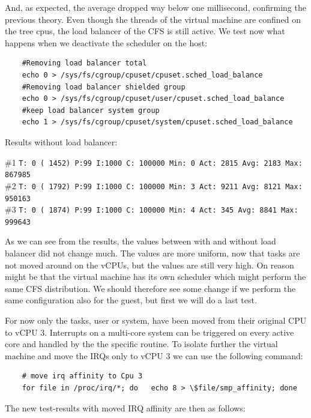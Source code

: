 \documentclass[]{scrartcl}
\begin{document}
And, as expected, the average dropped way below one millisecond, confirming the previous theory.
Even though the threads of the virtual machine are confined on the tree cpus, the load balancer of the CFS is still active. We test now what happens when we deactivate the scheduler on the host:

\begin{verbatim}
	#Removing load balancer total
	echo 0 > /sys/fs/cgroup/cpuset/cpuset.sched_load_balance
	#Removing load balancer shielded group
	echo 0 > /sys/fs/cgroup/cpuset/user/cpuset.sched_load_balance
	#keep load balancer system group
	echo 1 > /sys/fs/cgroup/cpuset/system/cpuset.sched_load_balance
\end{verbatim}

\noindent Results without load balancer:

\noindent \small \#1 \texttt{T: 0 ( 1452) P:99 I:1000 C: 100000 Min: 0 Act: 2815 Avg: 2183 Max:  867985}\\
\noindent \small \#2 \texttt{T: 0 ( 1792) P:99 I:1000 C: 100000 Min: 3 Act: 9211 Avg: 8121 Max:  950163}\\
\noindent \small \#3 \texttt{T: 0 ( 1874) P:99 I:1000 C: 100000 Min: 4 Act:  345 Avg: 8841 Max:  999643}

As we can see from the results, the values between with and without load balancer did not change much. The values are more uniform, now that tasks are not moved around on the vCPUs, but the values are still very high. On reason might be that the virtual machine has its own scheduler which might perform the same CFS distribution. We should therefore see some change if we perform the same configuration also for the guest, but first we will do a last test.

For now only the tasks, user or system, have been moved from their original CPU to vCPU 3. Interrupts on a multi-core system can be triggered on every active core and handled by the the specific routine. To isolate further the virtual machine and move the IRQs only to vCPU 3 we can use the following command: 

\begin{verbatim}
	# move irq affinity to Cpu 3
	for file in /proc/irq/*; do   echo 8 > \$file/smp_affinity; done
\end{verbatim}

\noindent The new test-results with moved IRQ affinity are then as follows:
\end{document}
